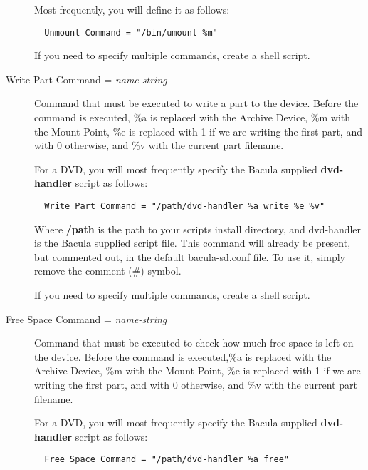 \begin{description}
   Most frequently, you will define it as follows:  

\footnotesize
\begin{verbatim}
  Unmount Command = "/bin/umount %m"
\end{verbatim}
\normalsize

  If you need to specify multiple commands, create a shell script.

\item [Write Part Command = {\it name-string}]
   Command that must be executed to write a part to the device. Before the 
   command is executed, \%a is replaced with the Archive Device, \%m with the 
   Mount Point, \%e is replaced with 1 if we are writing the first part,
   and with 0 otherwise, and \%v with the current part filename.

   For a DVD, you will most frequently specify the Bacula supplied  {\bf
   dvd-handler} script as follows:  

\footnotesize
\begin{verbatim}
  Write Part Command = "/path/dvd-handler %a write %e %v"
\end{verbatim}
\normalsize

  Where {\bf /path} is the path to your scripts install directory, and
  dvd-handler is the Bacula supplied script file.  
  This command will already be present, but commented out,
  in the default bacula-sd.conf file. To use it, simply remove
  the comment (\#) symbol.

  If you need to specify multiple commands, create a shell script.


\item [Free Space Command = {\it name-string}]
   Command that must be executed to check how much free space is left on the 
   device. Before the command is executed,\%a is replaced with the Archive
   Device, \%m with the Mount Point, \%e is replaced with 1 if we are writing
   the first part, and with 0 otherwise, and \%v with the current part filename.

   For a DVD, you will most frequently specify the Bacula supplied  {\bf
   dvd-handler} script as follows:  

\footnotesize
\begin{verbatim}
  Free Space Command = "/path/dvd-handler %a free"
\end{verbatim}
\normalsize


\end{description}
